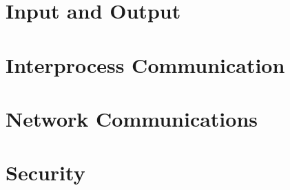 \documentclass[12pt]{article}
\begin{document}
 
 
 
 

 



\section{Input and Output} %

\section{Interprocess Communication} %

\section{Network Communications} %

\section{Security} %
\end{document}
